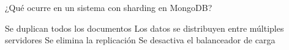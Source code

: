 \question[1] ¿Qué ocurre en un sistema con sharding en MongoDB?
\begin{choices}
\choice Se duplican todos los documentos
\CorrectChoice Los datos se distribuyen entre múltiples servidores
\choice Se elimina la replicación
\choice Se desactiva el balanceador de carga
\end{choices}